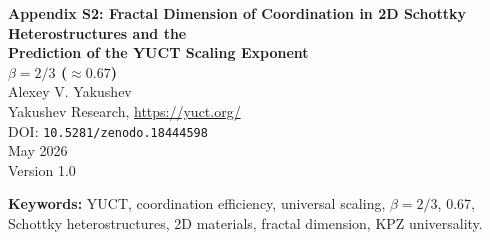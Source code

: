\documentclass[12pt,a4paper]{article}
\begin{document}
	
	\begin{titlepage}
		\centering
		\vspace*{1cm}
		{\Huge\bfseries Appendix S2: Fractal Dimension of Coordination in 2D Schottky Heterostructures and the \\ Prediction of the YUCT Scaling Exponent\\ $\beta = 2/3$ ($\approx 0.67$)}\\[1cm]
		{\large Alexey V. Yakushev}\\[0.3cm]
		{\normalsize Yakushev Research, \url{https://yuct.org/}}\\[1.5cm]
		{\normalsize DOI: \texttt{10.5281/zenodo.18444598}}\\[0.5cm]
		{\normalsize May 2026\\Version 1.0}\\[2cm]
		
		\begin{minipage}{0.9\textwidth}
			\begin{abstract}
				\noindent
				Ang, Yang \& Ang (Phys. Rev. Lett. 121, 056802, 2018) discovered
				universal current‑temperature scaling laws in two‑dimensional Schottky
				heterostructures: $\log(\mathcal{I}/T^{3/2}) \propto -1/T$ for lateral
				contacts and $\log(\mathcal{I}/T^{1}) \propto -1/T$ for vertical
				contacts with non‑conserved momentum. In this appendix we show that
				both exponents are governed by the effective fractal dimension
				$d_f$ of the coordination network that controls the transport.
				The YUCT universal error‑scaling law $\varepsilon = \kappa_c\alpha
				K_{\mathrm{eff}}^{-\beta}$ with $\beta = 2/3 \approx 0.67$ is linked
				to $d_f$ via $\beta = 2/d_f$. From the experimental current scaling
				we extract $d_f = 3$ for lateral contacts and $d_f = 2$ for
				vertical contacts, which yield $\beta = 2/3$ and $\beta = 1$
				respectively. The analysis predicts that relative current
				fluctuations in lateral Schottky diodes should follow
				$\varepsilon_{\mathrm{fluc}} \propto K_{\mathrm{eff}}^{-2/3}$,
				a falsifiable prediction that can be tested with standard
				noise‑spectroscopy. This work incorporates 2D Schottky
				heterostructures into the family of systems that exhibit or are
				predicted to exhibit the universal YUCT exponent
				$\beta = 2/3$ ($0.67$), extending the reach of the theory into
				solid‑state nano‑electronics.
			\end{abstract}
			\vspace{1cm}
			\noindent\small\textbf{Keywords:} YUCT, coordination efficiency, universal scaling,
			$\beta = 2/3$, 0.67, Schottky heterostructures, 2D materials,
			fractal dimension, KPZ universality.
		\end{minipage}
	\end{titlepage}
	
\end{document}
